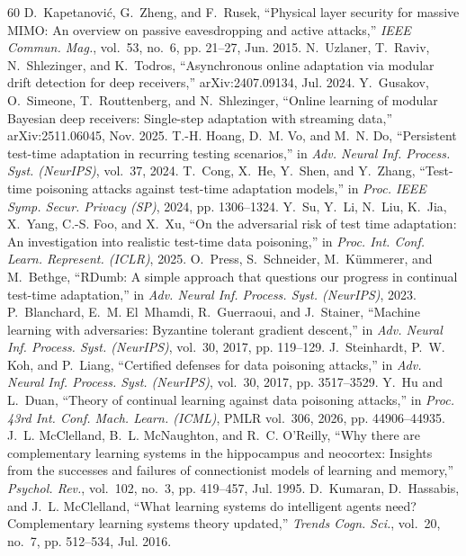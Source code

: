 \documentclass[journal]{IEEEtran}
\theoremstyle{remark}
\begin{document}
\begin{thebibliography}{60}
 D.~Kapetanovi\'c, G.~Zheng, and F.~Rusek, ``Physical layer security for massive MIMO: An overview on passive eavesdropping and active attacks,'' \emph{IEEE Commun. Mag.}, vol.~53, no.~6, pp. 21--27, Jun. 2015.
 N.~Uzlaner, T.~Raviv, N.~Shlezinger, and K.~Todros, ``Asynchronous online adaptation via modular drift detection for deep receivers,'' arXiv:2407.09134, Jul. 2024.
 Y.~Gusakov, O.~Simeone, T.~Routtenberg, and N.~Shlezinger, ``Online learning of modular Bayesian deep receivers: Single-step adaptation with streaming data,'' arXiv:2511.06045, Nov. 2025.
 T.-H. Hoang, D.~M. Vo, and M.~N. Do, ``Persistent test-time adaptation in recurring testing scenarios,'' in \emph{Adv. Neural Inf. Process. Syst. (NeurIPS)}, vol.~37, 2024.
 T.~Cong, X.~He, Y.~Shen, and Y.~Zhang, ``Test-time poisoning attacks against test-time adaptation models,'' in \emph{Proc. IEEE Symp. Secur. Privacy (SP)}, 2024, pp. 1306--1324.
 Y.~Su, Y.~Li, N.~Liu, K.~Jia, X.~Yang, C.-S. Foo, and X.~Xu, ``On the adversarial risk of test time adaptation: An investigation into realistic test-time data poisoning,'' in \emph{Proc. Int. Conf. Learn. Represent. (ICLR)}, 2025.
 O.~Press, S.~Schneider, M.~K{\"u}mmerer, and M.~Bethge, ``RDumb: A simple approach that questions our progress in continual test-time adaptation,'' in \emph{Adv. Neural Inf. Process. Syst. (NeurIPS)}, 2023.
 P.~Blanchard, E.~M. El~Mhamdi, R.~Guerraoui, and J.~Stainer, ``Machine learning with adversaries: Byzantine tolerant gradient descent,'' in \emph{Adv. Neural Inf. Process. Syst. (NeurIPS)}, vol.~30, 2017, pp. 119--129.
 J.~Steinhardt, P.~W. Koh, and P.~Liang, ``Certified defenses for data poisoning attacks,'' in \emph{Adv. Neural Inf. Process. Syst. (NeurIPS)}, vol.~30, 2017, pp. 3517--3529.
 Y.~Hu and L.~Duan, ``Theory of continual learning against data poisoning attacks,'' in \emph{Proc. 43rd Int. Conf. Mach. Learn. (ICML)}, PMLR vol.~306, 2026, pp. 44906--44935.
 J.~L. McClelland, B.~L. McNaughton, and R.~C. O'Reilly, ``Why there are complementary learning systems in the hippocampus and neocortex: Insights from the successes and failures of connectionist models of learning and memory,'' \emph{Psychol. Rev.}, vol.~102, no.~3, pp. 419--457, Jul. 1995.
 D.~Kumaran, D.~Hassabis, and J.~L. McClelland, ``What learning systems do intelligent agents need? Complementary learning systems theory updated,'' \emph{Trends Cogn. Sci.}, vol.~20, no.~7, pp. 512--534, Jul. 2016.

\end{thebibliography}
\end{document}
